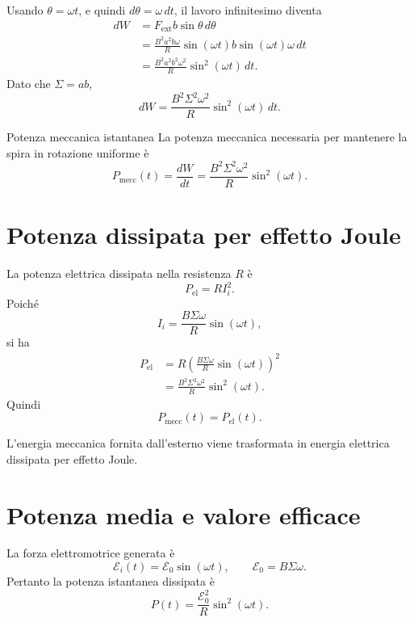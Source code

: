 \documentclass[a4paper]{article}
\begin{document}
Usando \(\theta=\omega t\), e quindi \(d\theta=\omega\,dt\), il lavoro infinitesimo diventa
\begin{align*}
dW
&=F_{\mathrm{ext}}b\sin\theta\,d\theta \\
&=\frac{B^2a^2b\omega}{R}\sin(\omega t)b\sin(\omega t)\omega\,dt \\
&=\frac{B^2a^2b^2\omega^2}{R}\sin^2(\omega t)\,dt.
\end{align*}
Dato che \(\Sigma=ab\),
\[
dW=\frac{B^2\Sigma^2\omega^2}{R}\sin^2(\omega t)\,dt.
\]

\begin{snippetproposition}{Potenza meccanica istantanea}
La potenza meccanica necessaria per mantenere la spira in rotazione uniforme è
\[
    P_{\mathrm{mecc}}(t)=\frac{dW}{dt}=\frac{B^2\Sigma^2\omega^2}{R}\sin^2(\omega t).
\]
\end{snippetproposition}

\section{Potenza dissipata per effetto Joule}

La potenza elettrica dissipata nella resistenza \(R\) è
\[
P_{\mathrm{el}}=RI_i^2.
\]
Poiché
\[
I_i=\frac{B\Sigma\omega}{R}\sin(\omega t),
\]
si ha
\begin{align*}
P_{\mathrm{el}}
&=R\left(\frac{B\Sigma\omega}{R}\sin(\omega t)\right)^2 \\
&=\frac{B^2\Sigma^2\omega^2}{R}\sin^2(\omega t).
\end{align*}
Quindi
\[
P_{\mathrm{mecc}}(t)=P_{\mathrm{el}}(t).
\]

L'energia meccanica fornita dall'esterno viene trasformata in energia elettrica dissipata per effetto Joule.

\section{Potenza media e valore efficace}

La forza elettromotrice generata è
\[
\mathcal{E}_i(t)=\mathcal{E}_0\sin(\omega t),
\qquad
\mathcal{E}_0=B\Sigma\omega.
\]
Pertanto la potenza istantanea dissipata è
\[
P(t)=\frac{\mathcal{E}_0^2}{R}\sin^2(\omega t).
\]

\begin{center}
\end{center}
\end{document}
